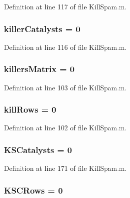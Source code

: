 Definition at line 117 of file Kill\-Spam.\-m.

\hypertarget{a00023_a1a42aaee01b2cc37a3835e0fe30cf9d3}{
\subsubsection[{killer\-Catalysts}]{\setlength{\rightskip}{0pt plus 5cm}killer\-Catalysts = 0}}\label{a00023_a1a42aaee01b2cc37a3835e0fe30cf9d3}


Definition at line 116 of file Kill\-Spam.\-m.

\hypertarget{a00023_a929016802e1ede2217a41240a6974fa6}{
\subsubsection[{killers\-Matrix}]{\setlength{\rightskip}{0pt plus 5cm}killers\-Matrix = 0}}\label{a00023_a929016802e1ede2217a41240a6974fa6}


Definition at line 103 of file Kill\-Spam.\-m.

\hypertarget{a00023_a747bc1d10158c78e88e314825ed41a13}{
\subsubsection[{kill\-Rows}]{ kill\-Rows = 0}}\label{a00023_a747bc1d10158c78e88e314825ed41a13}


Definition at line 102 of file Kill\-Spam.\-m.

\hypertarget{a00023_a25c085d4378366ed81f0f97547802c8f}{
\subsubsection[{K\-S\-Catalysts}]{\setlength{\rightskip}{0pt plus 5cm}K\-S\-Catalysts = 0}}\label{a00023_a25c085d4378366ed81f0f97547802c8f}


Definition at line 171 of file Kill\-Spam.\-m.

\hypertarget{a00023_a56aa0b3ac00410dc36f9043c641ae205}{
\subsubsection[{K\-S\-C\-Rows}]{\setlength{\rightskip}{0pt plus 5cm}K\-S\-C\-Rows = 0}}\label{a00023_a56aa0b3ac00410dc36f9043c641ae205}


